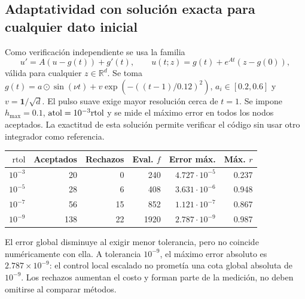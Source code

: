 \documentclass[11pt,a4paper]{article}
\theoremstyle{definition}\newtheorem{definition}[theorem]{Definición}
\theoremstyle{remark}\newtheorem{remark}[theorem]{Observación}
\newcommand{\R}{\mathbb R}\newcommand{\E}{\mathbb E}
\newcommand{\rtol}{\mathrm{rtol}}
\begin{document}
\subsection{Adaptatividad con solución exacta para cualquier dato inicial}
Como verificación independiente se usa la familia
\[
u'=A(u-g(t))+g'(t),\qquad
u(t;z)=g(t)+e^{At}(z-g(0)),
\]
válida para cualquier $z\in\R^d$. Se toma
$g(t)=a\odot\sin(\nu t)+v\exp(-((t-1)/0.12)^2)$,
$a_i\in[0.2,0.6]$ y $v=\mathbf1/\sqrt d$.
El pulso suave exige mayor resolución cerca de $t=1$.
Se impone $h_{\max}=0.1$, $\atol=10^{-3}\rtol$ y se mide el máximo error
en todos los nodos aceptados. La exactitud de esta solución permite
verificar el código sin usar otro integrador como referencia.
\begin{center}\small
\begin{tabular}{@{}rrrrrr@{}}\toprule
$\rtol$ & Aceptados & Rechazos & Eval. $f$ & Error máx. & Máx. $r$\\\midrule
$10^{-3}$ & 20 & 0 & 240 & $4.727\cdot10^{-5}$ & 0.237\\
$10^{-5}$ & 28 & 6 & 408 & $3.631\cdot10^{-6}$ & 0.948\\
$10^{-7}$ & 56 & 15 & 852 & $1.121\cdot10^{-7}$ & 0.867\\
$10^{-9}$ & 138 & 22 & 1920 & $2.787\cdot10^{-9}$ & 0.987\\\bottomrule
\end{tabular}\end{center}
El error global disminuye al exigir menor tolerancia, pero no coincide
numéricamente con ella. A tolerancia $10^{-9}$, el máximo error absoluto es
$2.787\times10^{-9}$: el control local escalado no prometía una cota global
absoluta de $10^{-9}$. Los rechazos aumentan el costo y forman parte de la
medición, no deben omitirse al comparar métodos.
\end{document}
